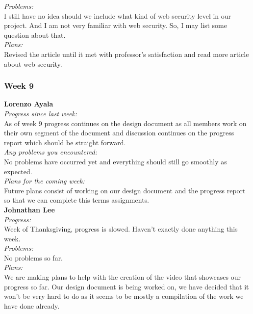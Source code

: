 \noindent\textit{Problems:}\\
\noindent  I still have no idea should we include what kind of web security level in our project. And I am not very familiar with web security. So, I may list some question about that.\\

\noindent\textit{Plans:}\\
\noindent  Revised the article until it met with professor's satisfaction and read more article about web security.\\

\subsubsection{Week 9}

\textbf{Lorenzo Ayala}\\
\noindent\textit{Progress since last week:}\\
As of week 9 progress continues on the design document as all members work on their own segment of the document and discussion continues on the progress report which should be straight forward.\\

\noindent\textit{Any problems you encountered:}\\
\noindent No problems have occurred yet and everything should still go smoothly as expected.\\

\noindent\textit{Plans for the coming week:}\\
\noindent Future plans consist of working on our design document and the progress report so that we can complete this terms assignments.\\

\noindent\textbf{Johnathan Lee}\\
\noindent\textit{Progress:}\\
Week of Thanksgiving, progress is slowed. Haven’t exactly done anything this week.\\

\noindent\textit{Problems:}\\
\noindent No problems so far.\\

\noindent\textit{Plans:}\\
\noindent We are making plans to help with the creation of the video that showcases our progress so far. Our design document is being worked on, we have decided that it won't be very hard to do as it seems to be mostly a compilation of the work we have done already.\\

